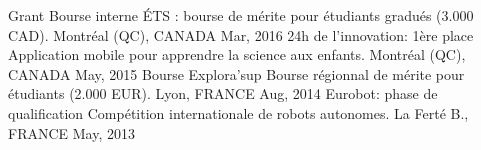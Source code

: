 


\begin{cvhonors}
\cvhonor
{Grant} %
{Bourse interne ÉTS : bourse de mérite pour étudiants gradués (3.000 CAD).} %
{\hspace{-5mm}Montréal (QC), CANADA} %
{Mar, 2016} %
\cvhonor
{24h de l'innovation: 1ère place} %
{Application mobile pour apprendre la science aux enfants.} %
{\hspace{-5mm}Montréal (QC), CANADA} %
{May, 2015} %
\cvhonor
{Bourse Explora'sup} %
{Bourse régionnal de mérite pour étudiants (2.000 EUR).} %
{Lyon, FRANCE} %
{Aug, 2014} %
\cvhonor
{Eurobot: phase de qualification} %
{Compétition internationale de robots autonomes.} %
{La Ferté B., FRANCE} %
{May, 2013} %
\end{cvhonors}
